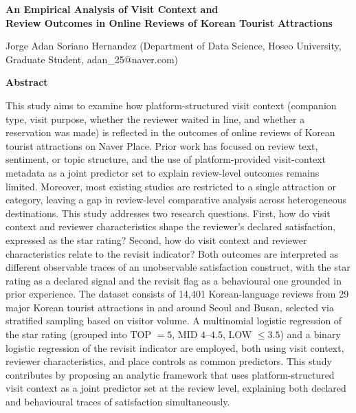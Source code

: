 \documentclass[10pt,a4paper]{article}
\title{}
\date{}
\begin{document}
\begin{center}
{\Large\textbf{An Empirical Analysis of Visit Context and\\[2pt]
Review Outcomes in Online Reviews of Korean Tourist Attractions}}

\vspace{12pt}

{\normalsize *Jorge Adan Soriano Hernandez (Department of Data Science,
Hoseo University, Graduate Student, adan\_25@naver.com)}

\end{center}

\vspace{10pt}

\noindent\textbf{\large Abstract}

\vspace{4pt}

\noindent
This study aims to examine how platform-structured visit context
(companion type, visit purpose, whether the reviewer waited in line, and
whether a reservation was made) is reflected in the outcomes of online
reviews of Korean tourist attractions on Naver Place. Prior work has
focused on review text, sentiment, or topic structure, and the use of
platform-provided visit-context metadata as a joint predictor set to
explain review-level outcomes remains limited. Moreover, most existing
studies are restricted to a single attraction or category, leaving a gap
in review-level comparative analysis across heterogeneous destinations.
This study addresses two research questions. First, how do visit context
and reviewer characteristics shape the reviewer's declared satisfaction,
expressed as the star rating? Second, how do visit context and reviewer
characteristics relate to the revisit indicator? Both outcomes are
interpreted as different observable traces of an unobservable
satisfaction construct, with the star rating as a declared signal and
the revisit flag as a behavioural one grounded in prior experience. The
dataset consists of 14{,}401 Korean-language reviews from 29 major
Korean tourist attractions in and around Seoul and Busan, selected via
stratified sampling based on visitor volume. A multinomial logistic
regression of the star rating (grouped into TOP $=5$\textbigstar,
MID $4$--$4.5$\textbigstar, LOW $\le 3.5$\textbigstar) and a binary
logistic regression of the revisit indicator are employed, both using
visit context, reviewer characteristics, and place controls as common
predictors. This study contributes by proposing an analytic framework
that uses platform-structured visit context as a joint predictor set at
the review level, explaining both declared and behavioural traces of
satisfaction simultaneously.
\end{document}
